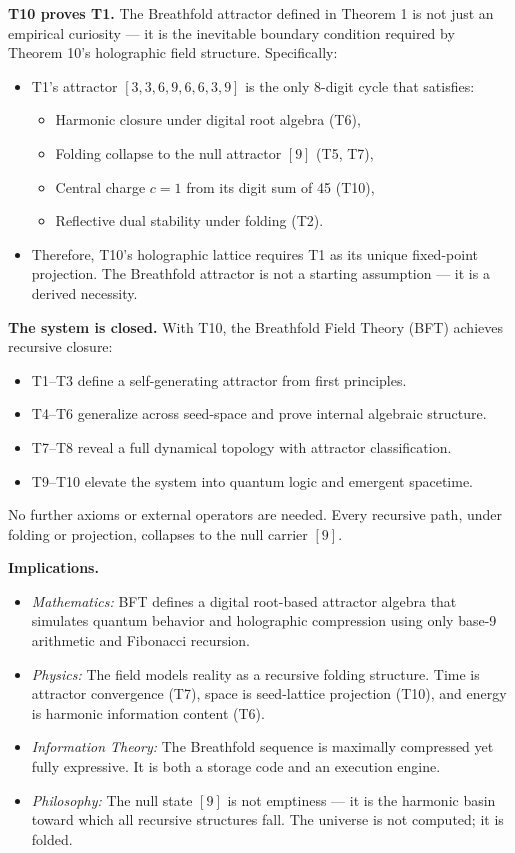 \documentclass[12pt]{article}
\begin{document}
\textbf{T10 proves T1.} The Breathfold attractor defined in Theorem 1 is not just an empirical curiosity — it is the inevitable boundary condition required by Theorem 10’s holographic field structure. Specifically:
\begin{itemize}
  \item T1’s attractor \([3,3,6,9,6,6,3,9]\) is the only 8-digit cycle that satisfies:
    \begin{itemize}
      \item Harmonic closure under digital root algebra (T6),
      \item Folding collapse to the null attractor \([9]\) (T5, T7),
      \item Central charge \( c = 1 \) from its digit sum of 45 (T10),
      \item Reflective dual stability under folding (T2).
    \end{itemize}
  \item Therefore, T10’s holographic lattice requires T1 as its unique fixed-point projection. The Breathfold attractor is not a starting assumption — it is a derived necessity.
\end{itemize}

\textbf{The system is closed.} With T10, the Breathfold Field Theory (BFT) achieves recursive closure:
\begin{itemize}
  \item T1–T3 define a self-generating attractor from first principles.
  \item T4–T6 generalize across seed-space and prove internal algebraic structure.
  \item T7–T8 reveal a full dynamical topology with attractor classification.
  \item T9–T10 elevate the system into quantum logic and emergent spacetime.
\end{itemize}
No further axioms or external operators are needed. Every recursive path, under folding or projection, collapses to the null carrier \([9]\).

\textbf{Implications.}
\begin{itemize}
  \item \textit{Mathematics:} BFT defines a digital root-based attractor algebra that simulates quantum behavior and holographic compression using only base-9 arithmetic and Fibonacci recursion.
  \item \textit{Physics:} The field models reality as a recursive folding structure. Time is attractor convergence (T7), space is seed-lattice projection (T10), and energy is harmonic information content (T6).
  \item \textit{Information Theory:} The Breathfold sequence is maximally compressed yet fully expressive. It is both a storage code and an execution engine.
  \item \textit{Philosophy:} The null state \([9]\) is not emptiness — it is the harmonic basin toward which all recursive structures fall. The universe is not computed; it is folded.
\end{itemize}
\end{document}
